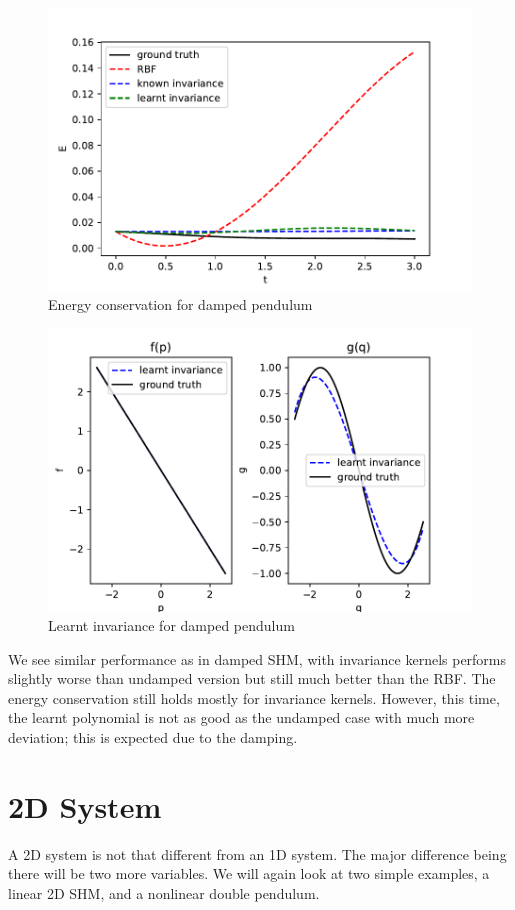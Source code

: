 \documentclass{statsmsc}
\begin{document}
\begin{figure}[H] 
  \includegraphics[width=0.8\linewidth]{../codes/figures/damped_pendulum_energy.pdf}
  \centering
  \caption{Energy conservation for damped pendulum}
  \label{fig:damped_pendulum_energy}
\end{figure}


\begin{figure}[H] 
  \includegraphics[width=0.8\linewidth]{../codes/figures/damped_pendulum_learnt.pdf}
  \centering
  \caption{Learnt invariance for damped pendulum}
  \label{fig:damped_pendulum_learnt}
\end{figure}

We see similar performance as in damped SHM, with invariance kernels performs slightly worse than undamped version but still much better than the RBF.
The energy conservation still holds mostly for invariance kernels.
However, this time, the learnt polynomial is not as good as the undamped case with much more deviation; this is expected due to the damping.

\section{2D System}
A 2D system is not that different from an 1D system. The major difference being there will be two more variables. 
We will again look at two simple examples, a linear 2D SHM, and a nonlinear double pendulum.
\end{document}
